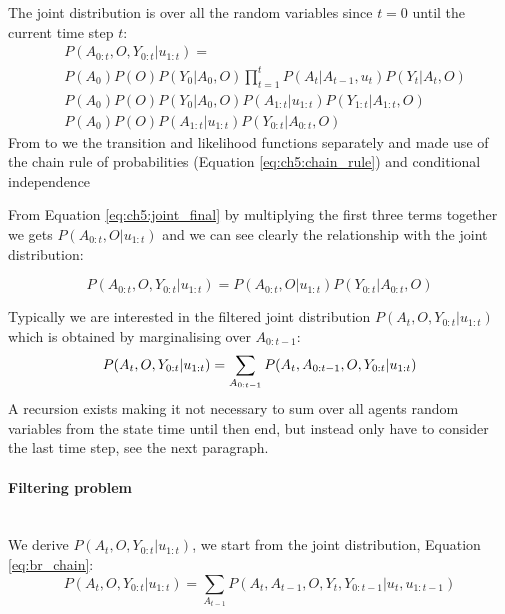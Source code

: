 The joint distribution is over all the random variables since $t=0$ until the current 
time step $t$:
\begin{align}
 &P(A_{0:t},O,Y_{0:t}|u_{1:t}) =\nonumber \\ 
 &P(A_0)P(O)P(Y_0|A_0,O)\prod_{t=1}^t P(A_t|A_{t-1},u_{t}) P(Y_t|A_t,O) \label{eq:ch5:app:joint} \\
 &P(A_0)P(O)P(Y_0|A_0,O) P(A_{1:t}|u_{1:t}) P(Y_{1:t}|A_{1:t},O)  \label{eq:ch5:app:joint_2} \\
 &P(A_0)P(O) P(A_{1:t}|u_{1:t}) P(Y_{0:t}|A_{0:t},O) \label{eq:ch5:joint_final}
\end{align}
From \label{eq:ch5:app:joint} to \label{eq:ch5:app:joint_2} we the transition and likelihood 
functions separately and made use of the chain rule of probabilities (Equation \ref{eq:ch5:chain_rule}) and conditional independence

From Equation \ref{eq:ch5:joint_final} by multiplying the first three terms together we gets
$P(A_{0:t},O|u_{1:t})$ and we can see clearly the relationship with the joint distribution:

\begin{equation}
 P(A_{0:t},O,Y_{0:t}|u_{1:t}) =  P(A_{0:t},O|u_{1:t}) P(Y_{0:t}|A_{0:t},O)
\end{equation}

Typically we are interested in the filtered joint distribution $P(A_t,O,Y_{0:t}|u_{1:t})$ which 
is obtained by marginalising over $A_{0:t-1}$:
\begin{equation}
  P(A_t,O,Y_{0:t}|u_{1:t}) = \sum_{A_{0:t-1}}  P(A_t,A_{0:t-1},O,Y_{0:t}|u_{1:t}) \\
\end{equation}
A recursion exists making it not necessary to sum over all agents random variables from the state time 
until then end, but instead only have to consider the last time step, see the next paragraph.

\paragraph{Filtering problem}\\
We derive $P(A_t,O,Y_{0:t}|u_{1:t})$, we start from the joint distribution, Equation \ref{eq:br_chain}:
\begin{equation}
   P(A_t,O,Y_{0:t}|u_{1:t})  = \sum_{A_{t-1}} P(A_t,A_{t-1},O,Y_t,Y_{0:t-1}|u_{t},u_{1:t-1}) \label{eq:br_chain} 
\end{equation}


